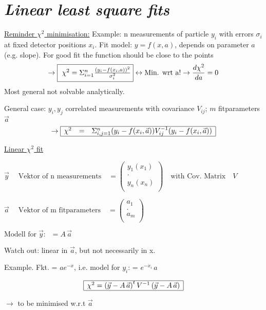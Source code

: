 \section{\LARGE \it Linear least square fits}
%
\sf
\Large
%
\underline{Reminder $\chi^2$ minimisation:} 
Example: n measurements of particle
$y_i$ with errors $\sigma_i$ at fixed detector 
positions $x_i$. Fit model:  $y = f(x,a)$,
depends on parameter $a$ (e.g. slope). 
%
For good fit the function should be close to the points
\[
\rightarrow 
\mbox{\framebox{
$ \chi^2 = \Sigma_{i=1}^n \frac{ (y_i-f(x_i,a))^2}{\sigma_i^2} $}}
\leftrightarrow \mbox{Min. wrt a!}
\rightarrow \frac{d\chi^2}{da} = 0
\]
Most general not solvable analytically.
%

\noindent
General case:
$y_i,y_j$ correlated measurements with covariance
$V_{ij}$; $m$ fitparameters $\vec{a}$
\[ \rightarrow \begin{array}{|lll|}
\hline
 \chi^2 &  = & \Sigma_{i,j=1}^n 
(y_i - f(x_i,\vec{a}))  V_{ij}^{-1} (y_i - f(x_i,\vec{a}))\\
\hline
\end{array}
\]

\noindent
\vspace{3mm}
\underline{Linear $\chi^2$ fit}

$ \vec{y} \; \quad \mbox{Vektor of n measurements} \quad =
\left( \begin{array}{l}
y_1(x_1)\\
. \\
y_n(x_n)\\
\end{array}
\right)
\quad \mbox{with Cov. Matrix} \quad V
$
\vspace{5mm}

%
$ \vec{a} \; \quad \mbox{Vektor of m fitparameters} \quad =
\left( \begin{array}{l}
a_1\\
. \\
a_m\\
\end{array}
\right)
$

$\mbox{Modell for}\; \vec{y}: \;\; =   A \,\vec{a}$

Watch out: linear in $\vec{a}$, but not necessarily in x.

Example. Fkt. =  $a e^{-x}$, i.e. model for $y_i$: =   $e^{-x_i}\, a$


\[ 
\begin{array}{|l|}
\hline
\chi^2 = \left(\vec{y} - A \, \vec{a}\right)^t V^{-1}
            \left(\vec{y} - A \, \vec{a}\right)
\\
\hline
\end{array}
\]

$\rightarrow$ to be minimised w.r.t $\vec{a}$
